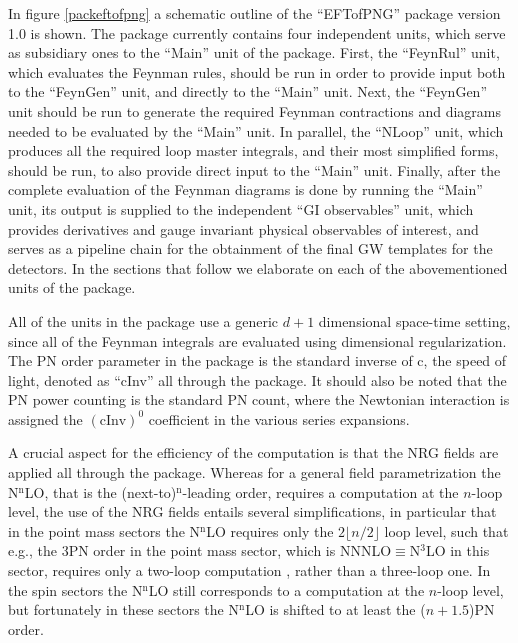 \documentclass[a4paper,11pt]{article}
\begin{document}
In figure \ref{packeftofpng} a schematic outline of the ``EFTofPNG'' package version 1.0 is 
shown. The package currently contains four independent units, which serve as subsidiary ones 
to the ``Main'' unit of the package. First, the ``FeynRul'' unit, which evaluates the 
Feynman rules, should be run in order to provide input both to the ``FeynGen'' unit, and 
directly to the ``Main'' unit. Next, the ``FeynGen'' unit should be run to generate the 
required Feynman contractions and diagrams needed to be evaluated by the ``Main'' unit. In 
parallel, the ``NLoop'' unit, which produces all the required loop master integrals, and 
their most simplified forms, should be run, to also provide direct input to the ``Main'' 
unit. Finally, after the complete evaluation of the Feynman diagrams is done by running the 
``Main'' unit, its output is supplied to the independent ``GI observables'' unit, which 
provides derivatives and gauge invariant physical observables of interest, and serves as 
a pipeline chain for the obtainment of the final GW templates for the detectors. In the 
sections that follow we elaborate on each of the abovementioned units of the package. 

All of the units in the package use a generic $d+1$ dimensional space-time setting,  
since all of the Feynman integrals are evaluated using dimensional regularization.
The PN order parameter in the package is the standard inverse of c, the speed of light, 
denoted as ``cInv'' all through the package. It should also be noted that the PN power 
counting is the standard PN count, where the Newtonian interaction is assigned the 
$(\text{cInv})^0$ coefficient in the various series expansions. 

A crucial aspect for the efficiency of the computation is that the NRG fields are applied 
all through the package. Whereas for a general field parametrization
the N$^{\text{n}}$LO, that is the (next-to)$^{\text{n}}$-leading order, requires a 
computation at the $n$-loop level, the use of the NRG fields entails several 
simplifications, in particular that in the point mass sectors the N$^{\text{n}}$LO requires 
only the $2\lfloor n/2\rfloor$ loop level, such that e.g., the 3PN order in the point mass 
sector, which is NNNLO$\equiv$N$^3$LO in this sector, requires only a two-loop computation 
\cite{Kol:2007bc, Kol:2010ze}, rather than a three-loop one. In the spin sectors the 
N$^\text{n}$LO still corresponds to a computation at the $n$-loop level, but fortunately in 
these sectors the N$^\text{n}$LO is shifted to at least the ($n+1.5$)PN order. 
\end{document}
